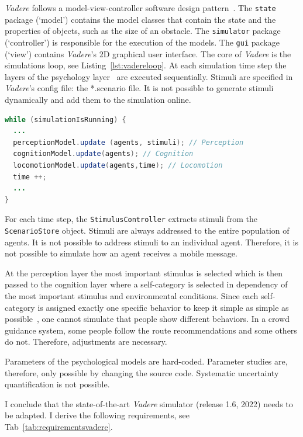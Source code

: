 \textit{Vadere} follows a model-view-controller software design pattern~\cite{kleinmeier-2019-cdyn}. The \lstinline{state} package (`model') contains the model classes that contain the state and the properties of objects, such as the size of an obstacle. The \lstinline{simulator} package (`controller') is responsible for the execution of the models. The \lstinline{gui} package (`view') contains \textit{Vadere}'s 2D graphical user interface. The core of \textit{Vadere} is the simulations loop, see Listing~\ref{lst:vadereloop}. At each simulation time step the layers of the psychology layer~\cite{kleinmeier-2021-cdyn} are executed sequentially. 
Stimuli are specified in \textit{Vadere}'s config file: the *.scenario file. It is not possible to generate stimuli dynamically and add them to the simulation online. 


\begin{lstlisting}[language=java, caption={Vadere simulation loop including psychology layer~\cite{kleinmeier-2020-cdyn}.},label=lst:vadereloop]
while (simulationIsRunning) {
  ...
  perceptionModel.update (agents, stimuli); // Perception
  cognitionModel.update(agents); // Cognition
  locomotionModel.update(agents,time); // Locomotion
  time ++;
  ...
}
\end{lstlisting}




For each time step, the \lstinline{StimulusController} extracts stimuli from the \lstinline{ScenarioStore} object.  Stimuli are always addressed to the entire population of agents. It is not possible to address stimuli to an individual agent. Therefore, it is not possible to simulate how an agent receives a mobile message.


At the perception layer the most important stimulus is selected which is then passed to the cognition layer where a self-category is selected in dependency of the most important stimulus and environmental conditions.  
Since each self-category is assigned exactly one specific behavior to keep it simple as simple as possible~\cite[p.95]{kleinmeier-2021-cdyn}, one cannot simulate that people show different behaviors. In a crowd guidance system, some people follow the route recommendations and some others do not. Therefore, adjustments are necessary.

Parameters of the psychological models are hard-coded. Parameter studies are, therefore, only possible by changing the source code. Systematic uncertainty quantification is not possible.


I conclude that the state-of-the-art \textit{Vadere} simulator (release 1.6, 2022) needs to be adapted. I derive the following requirements, see Tab~\ref{tab:requirementsvadere}.

